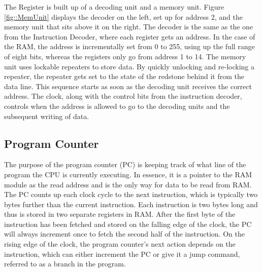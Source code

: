 The Register is built up of a decoding unit and a memory unit. Figure \ref{fig::MemUnit} displays the decoder on the left, set up for address 2, and the memory unit that sits above it on the right. The decoder is the same as the one from the Instruction Decoder, where each register gets an address. In the case of the RAM, the address is incrementally set from 0 to 255, using up the full range of eight bits, whereas the registers only go from address 1 to 14. The memory unit uses lockable repeaters to store data. By quickly unlocking and re-locking a repeater, the repeater gets set to the state of the redstone behind it from the data line. This sequence starts as soon as the decoding unit receives the correct address. The clock, along with the control bits from the instruction decoder, controls when the address is allowed to go to the decoding units and the subsequent writing of data.

\subsection{Program Counter}
The purpose of the program counter (PC) is keeping track of what line of the program the CPU is currently executing. In essence, it is a pointer to the RAM module as the read address and is the only way for data to be read from RAM. The PC counts up each clock cycle to the next instruction, which is typically two bytes further than the current instruction. Each instruction is two bytes long and thus is stored in two separate registers in RAM. After the first byte of the instruction has been fetched and stored on the falling edge of the clock, the PC will always increment once to fetch the second half of the instruction. On the rising edge of the clock, the program counter's next action depends on the instruction, which can either increment the PC or give it a jump command, referred to as a branch in the program.

